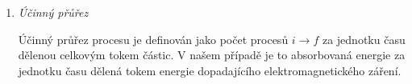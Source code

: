 \begin{solution}
\begin{enumerate}
		Nyní již máme v rukou vše, co potřebujeme k použití Fermiho zlatého pravidla~\eqref{eq:FermiGoldenRuleHarmonic}.
		Po dosazení do něj vychází
		\begin{align}\label{eq:PhotoefectTransitionRate}
			\frac{\d w_{i\rightarrow f}}{\d\Omega}
				&=\frac{2\pi}{\hbar}\abs{h_{fi}}^{2}\frac{\d\rho}{\d\Omega}=\nonumber\\
				&=\frac{2\pi}{\hbar}
					\abs{\frac{\im\hbar eA_{0}}{ma_{0}\sqrt{\pi a_{0}^{3}V}}
					\frac{8\im\pi a_{0}^{4}}{\left(1+q^{2}a_{0}^{2}\right)^{2}}\,
						\vector{\epsilon}\cdot\vector{k}}^{2}
					\frac{V}{(2\pi\hbar)^{3}}\,\hbar km=\nonumber\\
				&=\frac{16}{\pi\hbar}\frac{(eA_{0})^{2}}{m}
					\frac{\left(\vector{\epsilon}\cdot\vector{k}\right)^{2}ka_{0}^{3}}
						{\left(1+q^{2}a_{0}^{2}\right)^{4}}
		\end{align}
		
	\item
		\emph{Účinný přůřez}
	
		Účinný průřez procesu je definován jako počet procesů $i\rightarrow f$ za jednotku času dělenou celkovým tokem částic.
		V našem případě je to absorbovaná energie za jednotku času dělená tokem energie dopadajícího elektromagnetického záření.
		

\end{enumerate}
\end{solution}
